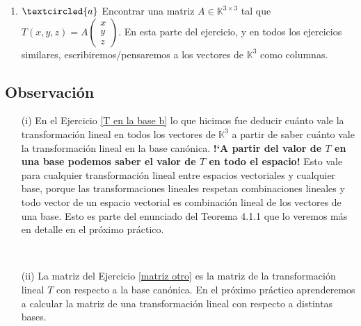 \documentclass[12pt]{amsart}
\begin{document}
\begin{enumerate}[resume, topsep=5pt,itemsep=5pt]
\begin{enumerate}
\item\label{matriz otro} $\textcircled{a}$ Encontrar una matriz $A\in\mathbb{K}^{3\times3}$ tal que
     $T(x,y,z)=A\left(\begin{matrix}
	x\\y\\z \end{matrix}
	\right)$. En esta parte del ejercicio, y en todos los ejercicios similares, escribiremos/pensaremos a los vectores de $\mathbb{K}^3$ como columnas.

\end{enumerate}

\subsection*{Observaci\'on}
\begin{itemize}
\item[(i)] En el Ejercicio \eqref{T en la base b} lo que hicimos fue deducir cu\'anto vale la transformaci\'on lineal en todos los vectores de $\mathbb{K}^3$ a partir de saber cu\'anto vale la transformaci\'on lineal en la base can\'onica. \textbf{!`A partir del valor de $T$ en una base podemos saber el valor de $T$ en todo el espacio!} Esto vale para cualquier transformaci\'on lineal entre espacios vectoriales y cualquier base, porque las transformaciones lineales res\-petan combinaciones lineales y todo vector de un espacio vectorial es combinaci\'on lineal de los vectores de una base. Esto es parte del enunciado del Teorema 4.1.1 que lo veremos m\'as en detalle en el pr\'oximo pr\'actico.

\

\item[(ii)] La matriz del Ejercicio \eqref{matriz otro} es la matriz de la transformaci\'on lineal $T$ con respecto a la base can\'onica. En el pr\'oximo pr\'actico aprenderemos a calcular la matriz de una transformaci\'on lineal con respecto a distintas bases.

\end{itemize}

\


\end{enumerate}
\end{document}
